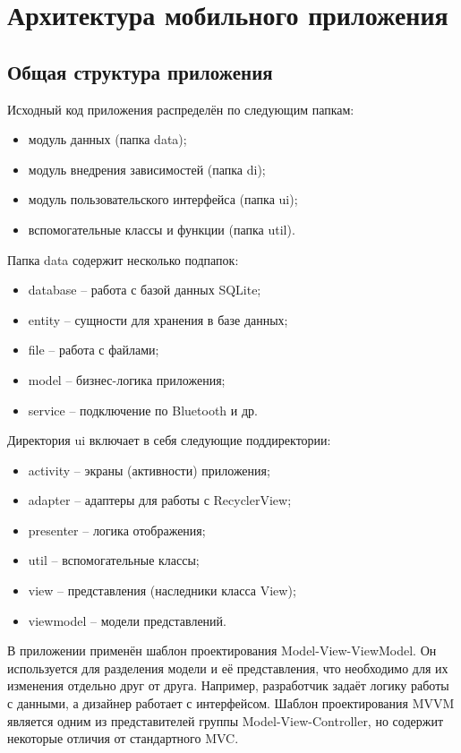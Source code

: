 
\section{Архитектура мобильного приложения} %
\label{sec:arch}


\subsection{Общая структура приложения}
\label{sub:arch:struct}

Исходный код приложения распределён по следующим папкам:
\begin{itemize}
	\item модуль данных (папка data);
	\item модуль внедрения зависимостей (папка di);
	\item модуль пользовательского интерфейса (папка ui);
	\item вспомогательные классы и функции (папка util).
\end{itemize}

Папка data содержит несколько подпапок:
\begin{itemize}
	\item database -- работа с базой данных SQLite;
	\item entity -- сущности для хранения в базе данных;
	\item file -- работа с файлами;
	\item model -- бизнес-логика приложения;
	\item service -- подключение по Bluetooth и др.
\end{itemize}

Директория ui включает в себя следующие поддиректории:
\begin{itemize}
	\item activity -- экраны (активности) приложения;
	\item adapter -- адаптеры для работы с RecyclerView;
	\item presenter -- логика отображения;
	\item util -- вспомогательные классы;
	\item view -- представления (наследники класса View);
	\item viewmodel -- модели представлений.
\end{itemize}

В приложении применён шаблон проектирования Model-View-ViewModel. Он используется для разделения модели и её представления, что необходимо для их изменения отдельно друг от друга. Например, разработчик задаёт логику работы с данными, а дизайнер работает с интерфейсом. Шаблон проектирования MVVM является одним из представителей группы Model-View-Controller, но содержит некоторые отличия от стандартного MVC.

